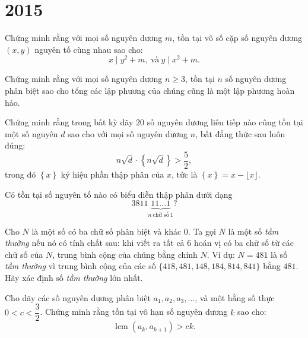 \documentclass[./m.tex]{subfiles}
\begin{document}
\section{2015}

\begin{problem}\label{problem:BGR-2015-EGMO-TST-P4}
	Chứng minh rằng với mọi số nguyên dương \( m \), tồn tại vô số cặp số nguyên dương \( (x, y) \) nguyên tố cùng nhau sao cho:
	\[ x \mid y^2 + m,\ \text{và}\ y \mid x^2 + m. \]
\end{problem}

\begin{problem}\label{problem:BGR-2015-EGMO-TST-P6}
	Chứng minh rằng với mọi số nguyên dương \( n \geq 3 \),
	tồn tại \( n \) số nguyên dương phân biệt sao cho tổng các lập phương của chúng cũng là một lập phương hoàn hảo.
\end{problem}

\begin{problem}\label{problem:BMO-2015-P4}
    Chứng minh rằng trong bất kỳ dãy \( 20 \) số nguyên dương liên tiếp nào cũng tồn tại một số nguyên \( d \) sao cho với mọi số nguyên dương \( n \),
    bất đẳng thức sau luôn đúng:
    \[
        n \sqrt{d} \cdot \left\{n \sqrt{d} \right\} > \frac{5}{2},
    \]
    trong đó \( \left\{ x \right\} \) ký hiệu phần thập phân của \( x \), tức là \( \left\{ x \right\} = x - \lfloor x \rfloor \).
\end{problem}

\begin{problem}\label{problem:BxMO-2015-P3}
	Có tồn tại số nguyên tố nào có biểu diễn thập phân dưới dạng
	\[
		3811\underbrace{11\ldots1}_{n\ \text{chữ số}\ 1}?
	\]
\end{problem}

\begin{problem}\label{problem:CAN-2015-QRC-P3}
	Cho \( N \) là một số có ba chữ số phân biệt và khác 0. Ta gọi \( N \) là một số \textit{tầm thường} nếu nó có tính chất sau:
	khi viết ra tất cả 6 hoán vị có ba chữ số từ các chữ số của \( N \), trung bình cộng của chúng bằng chính \( N \).
	Ví dụ: \( N = 481 \) là số \textit{tầm thường} vì trung bình cộng của các số \( \{418, 481, 148, 184, 814, 841\} \) bằng \( 481 \).
	Hãy xác định số \textit{tầm thường} lớn nhất.	
\end{problem}

\begin{problem}\label{problem:CHN-2015-TST1-D1-P2}
	Cho dãy các số nguyên dương phân biệt \( a_1, a_2, a_3, \ldots \), và một hằng số thực \( 0 < c < \dfrac{3}{2} \).  
	Chứng minh rằng tồn tại vô hạn số nguyên dương \( k \) sao cho:
	\[
		\operatorname{lcm}(a_k, a_{k+1}) > c k.
	\]
\end{problem}
\end{document}
